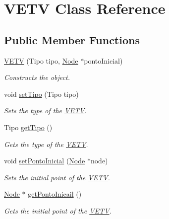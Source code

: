 \hypertarget{class_v_e_t_v}{}\section{V\+E\+TV Class Reference}
\label{class_v_e_t_v}
\subsection*{Public Member Functions}
\begin{DoxyCompactItemize}
\item 
\mbox{\hyperlink{class_v_e_t_v_a6608e4fe450f50db107f44012fdeedb3}{V\+E\+TV}} (Tipo tipo, \mbox{\hyperlink{class_node}{Node}} $\ast$ponto\+Inicial)
\begin{DoxyCompactList}\small\item\em Constructs the object. \end{DoxyCompactList}\item 
\mbox{\label{class_v_e_t_v_af6e77ffe0f6c0449f7dd0769e82ef35d}} 
void \mbox{\hyperlink{class_v_e_t_v_af6e77ffe0f6c0449f7dd0769e82ef35d}{set\+Tipo}} (Tipo tipo)
\begin{DoxyCompactList}\small\item\em Sets the type of the \mbox{\hyperlink{class_v_e_t_v}{V\+E\+TV}}. \end{DoxyCompactList}\item 
Tipo \mbox{\hyperlink{class_v_e_t_v_a98c67beffd973984edc14a9a6c3fe858}{get\+Tipo}} ()
\begin{DoxyCompactList}\small\item\em Gets the type of the \mbox{\hyperlink{class_v_e_t_v}{V\+E\+TV}}. \end{DoxyCompactList}\item 
\mbox{\label{class_v_e_t_v_aa5e1e406e795defdac1063679b316666}} 
void \mbox{\hyperlink{class_v_e_t_v_aa5e1e406e795defdac1063679b316666}{set\+Ponto\+Inicial}} (\mbox{\hyperlink{class_node}{Node}} $\ast$node)
\begin{DoxyCompactList}\small\item\em Sets the initial point of the \mbox{\hyperlink{class_v_e_t_v}{V\+E\+TV}}. \end{DoxyCompactList}\item 
\mbox{\hyperlink{class_node}{Node}} $\ast$ \mbox{\hyperlink{class_v_e_t_v_a3340f7ffe712a82464823f39a49814da}{get\+Ponto\+Inicail}} ()
\begin{DoxyCompactList}\small\item\em Gets the initial point of the \mbox{\hyperlink{class_v_e_t_v}{V\+E\+TV}}. \end{DoxyCompactList}\item 

\end{DoxyCompactItemize}
